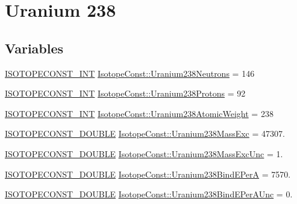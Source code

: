 \hypertarget{group___isotope_const-_uranium-_u238}{}\section{Uranium 238}
\label{group___isotope_const-_uranium-_u238}
\subsection*{Variables}
\begin{DoxyCompactItemize}
\item 
\mbox{\hyperlink{group___isotope_const-_macros_ga5f18360b3e99483a35c32d789e62621c}{I\+S\+O\+T\+O\+P\+E\+C\+O\+N\+S\+T\+\_\+\+I\+NT}} \mbox{\hyperlink{group___isotope_const-_uranium-_u238_gadf95924215ae26b622421d624d18d4ed}{Isotope\+Const\+::\+Uranium238\+Neutrons}} = 146
\item 
\mbox{\hyperlink{group___isotope_const-_macros_ga5f18360b3e99483a35c32d789e62621c}{I\+S\+O\+T\+O\+P\+E\+C\+O\+N\+S\+T\+\_\+\+I\+NT}} \mbox{\hyperlink{group___isotope_const-_uranium-_u238_gaf78ea13487c57359f79970f76b5ffa6a}{Isotope\+Const\+::\+Uranium238\+Protons}} = 92
\item 
\mbox{\hyperlink{group___isotope_const-_macros_ga5f18360b3e99483a35c32d789e62621c}{I\+S\+O\+T\+O\+P\+E\+C\+O\+N\+S\+T\+\_\+\+I\+NT}} \mbox{\hyperlink{group___isotope_const-_uranium-_u238_ga0ddc305b1c749bf000443ff2f12a3e95}{Isotope\+Const\+::\+Uranium238\+Atomic\+Weight}} = 238
\item 
\mbox{\hyperlink{group___isotope_const-_macros_ga8f45a7272ce02c0b4c65c44636ed719a}{I\+S\+O\+T\+O\+P\+E\+C\+O\+N\+S\+T\+\_\+\+D\+O\+U\+B\+LE}} \mbox{\hyperlink{group___isotope_const-_uranium-_u238_ga21b6fa820a3aa6013058128cfe357e22}{Isotope\+Const\+::\+Uranium238\+Mass\+Exc}} = 47307.
\item 
\mbox{\hyperlink{group___isotope_const-_macros_ga8f45a7272ce02c0b4c65c44636ed719a}{I\+S\+O\+T\+O\+P\+E\+C\+O\+N\+S\+T\+\_\+\+D\+O\+U\+B\+LE}} \mbox{\hyperlink{group___isotope_const-_uranium-_u238_gaeb8286c90c528432a0923870bd13a8e6}{Isotope\+Const\+::\+Uranium238\+Mass\+Exc\+Unc}} = 1.
\item 
\mbox{\hyperlink{group___isotope_const-_macros_ga8f45a7272ce02c0b4c65c44636ed719a}{I\+S\+O\+T\+O\+P\+E\+C\+O\+N\+S\+T\+\_\+\+D\+O\+U\+B\+LE}} \mbox{\hyperlink{group___isotope_const-_uranium-_u238_gaaaa0f1aebb932d99df8f3581b610090d}{Isotope\+Const\+::\+Uranium238\+Bind\+E\+PerA}} = 7570.
\item 
\mbox{\hyperlink{group___isotope_const-_macros_ga8f45a7272ce02c0b4c65c44636ed719a}{I\+S\+O\+T\+O\+P\+E\+C\+O\+N\+S\+T\+\_\+\+D\+O\+U\+B\+LE}} \mbox{\hyperlink{group___isotope_const-_uranium-_u238_gae94fcc41e4793866402c48442d22930c}{Isotope\+Const\+::\+Uranium238\+Bind\+E\+Per\+A\+Unc}} = 0.

\end{DoxyCompactItemize}
